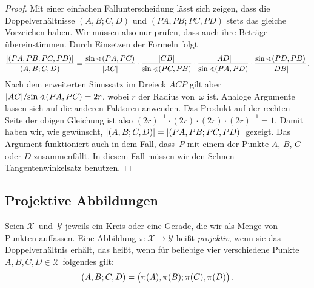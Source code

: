\begin{proof}
	Mit einer einfachen Fallunterscheidung lässt sich zeigen, dass die Doppelverhältnisse $(A,B;C,D)$ und $(PA,PB;PC,PD)$ stets das gleiche Vorzeichen haben. Wir müssen also nur prüfen, dass auch ihre Beträge übereinstimmen. Durch Einsetzen der Formeln folgt
	\begin{equation*}
		\frac{\abs{(PA,PB;PC,PD)}}{\abs{(A,B;C,D)}}=\frac{\sin\winkel(PA,PC)}{\abs{AC}}\cdot \frac{\abs{CB}}{\sin\winkel (PC,PB)}\cdot \frac{\abs{AD}}{\sin\winkel(PA,PD)}\cdot \frac{\sin\winkel(PD,PB)}{\abs{DB}}\,.
	\end{equation*}
	Nach dem erweiterten Sinussatz im Dreieck $ACP$ gilt aber $\abs{AC}/\!\sin\winkel(PA,PC)=2r$, wobei $r$ der Radius von~$\omega$ ist.
	Analoge Argumente lassen sich auf die anderen Faktoren anwenden. Das Produkt auf der rechten Seite der obigen Gleichung ist also $(2r)^{-1}\cdot (2r)\cdot (2r)\cdot (2r)^{-1}=1$.
	Damit haben wir, wie gewünscht, $\abs{(A,B;C,D)}=\abs{(PA,PB;PC,PD)}$ gezeigt. Das Argument funktioniert auch in dem Fall, dass~$P$ mit einem der Punkte $A$, $B$, $C$ oder $D$ zusammenfällt. In diesem Fall müssen wir den Sehnen-Tangentenwinkelsatz benutzen.
\end{proof}

\subsection*{Projektive Abbildungen}
\begin{definition}
	Seien $\mathcal X$~und~$\mathcal Y$ jeweils ein Kreis oder eine Gerade, die wir als Menge von Punkten auffassen.
	Eine Abbildung $\pi\colon \mathcal X\to \mathcal Y$ heißt \emph{projektiv}, wenn sie das Doppelverhältnis erhält, das heißt, wenn für beliebige vier verschiedene Punkte $A,B,C,D\in\mathcal X$ folgendes gilt:
	\begin{equation*}
		(A,B;C,D)=\parens[\big]{\pi(A),\pi(B);\pi(C),\pi(D)}\,.
	\end{equation*}
\end{definition}

